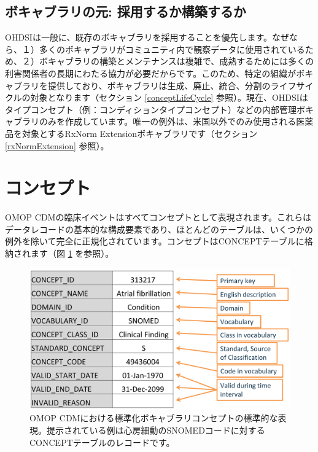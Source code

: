 \documentclass[
  11pt]{book}
\theoremstyle{definition}
\theoremstyle{definition}
\theoremstyle{definition}
\theoremstyle{definition}
\theoremstyle{remark}
\begin{document}
\subsection{ボキャブラリの元: 採用するか構築するか}\label{ux30dcux30adux30e3ux30d6ux30e9ux30eaux306eux5143-ux63a1ux7528ux3059ux308bux304bux69cbux7bc9ux3059ux308bux304b}

OHDSIは一般に、既存のボキャブラリを採用することを優先します。なぜなら、１）多くのボキャブラリがコミュニティ内で観察データに使用されているため、２）ボキャブラリの構築とメンテナンスは複雑で、成熟するためには多くの利害関係者の長期にわたる協力が必要だからです。このため、特定の組織がボキャブラリを提供しており、ボキャブラリは生成、廃止、統合、分割のライフサイクルの対象となります（セクション \ref{conceptLifeCycle} 参照）。現在、OHDSIはタイプコンセプト（例：コンディションタイプコンセプト）などの内部管理ボキャブラリのみを作成しています。唯一の例外は、米国以外でのみ使用される医薬品を対象とするRxNorm Extensionボキャブラリです（セクション \ref{rxNormExtension} 参照）。

\section{コンセプト}\label{ux30b3ux30f3ux30bbux30d7ux30c8}

OMOP CDMの臨床イベントはすべてコンセプトとして表現されます。これらはデータレコードの基本的な構成要素であり、ほとんどのテーブルは、いくつかの例外を除いて完全に正規化されています。コンセプトはCONCEPTテーブルに格納されます（図 \ref{fig:concept} を参照）。

\begin{figure}

{\centering \includegraphics[width=0.9\linewidth]{images/StandardizedVocabularies/concept} 

}

\caption{OMOP CDMにおける標準化ボキャブラリコンセプトの標準的な表現。提示されている例は心房細動のSNOMEDコードに対するCONCEPTテーブルのレコードです。}\label{fig:concept}
\end{figure}
\end{document}
